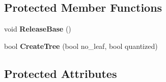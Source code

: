 \subsection*{Protected Member Functions}
\begin{DoxyCompactItemize}
\item 
void {\bfseries Release\+Base} ()\hypertarget{classBaseModel_ac0b331eda307bebf1c2b0ed568cd0b65}{}\label{classBaseModel_ac0b331eda307bebf1c2b0ed568cd0b65}

\item 
bool {\bfseries Create\+Tree} (bool no\+\_\+leaf, bool quantized)\hypertarget{classBaseModel_acd802b59a4199af81a6b629c386bd950}{}\label{classBaseModel_acd802b59a4199af81a6b629c386bd950}

\end{DoxyCompactItemize}
\subsection*{Protected Attributes}
